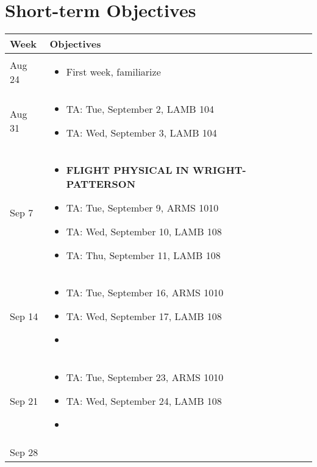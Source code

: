 \documentclass{article}
\begin{document}
\section{Short-term Objectives}


\begin{center}
\begin{xltabular}{\linewidth}{ s | M } 
Week 	& Objectives \\
\hline
Aug 24 	&
\begin{itemize}
\item First week, familiarize
\end{itemize}
\\
\hline
Aug 31	&
\begin{itemize}
    \item TA: Tue, September 2, LAMB 104
    \item TA: Wed, September 3, LAMB 104
\end{itemize}
\\
\hline
Sep 7 	&
\begin{itemize}
    \item \textbf{FLIGHT PHYSICAL IN WRIGHT-PATTERSON}
    \item TA: Tue, September 9, ARMS 1010
    \item TA: Wed, September 10, LAMB 108
    \item TA: Thu, September 11, LAMB 108
\end{itemize}
\\
\hline
Sep 14 	&
\begin{itemize}
    \item TA: Tue, September 16, ARMS 1010
    \item TA: Wed, September 17, LAMB 108
    \item
\end{itemize}
\\
\hline
Sep 21 	&
\begin{itemize}
    \item TA: Tue, September 23, ARMS 1010
    \item TA: Wed, September 24, LAMB 108
    \item
\end{itemize}
\\
\hline
Sep 28 	&
\begin{itemize}

\end{itemize}
\end{xltabular}
\end{center}
\end{document}
